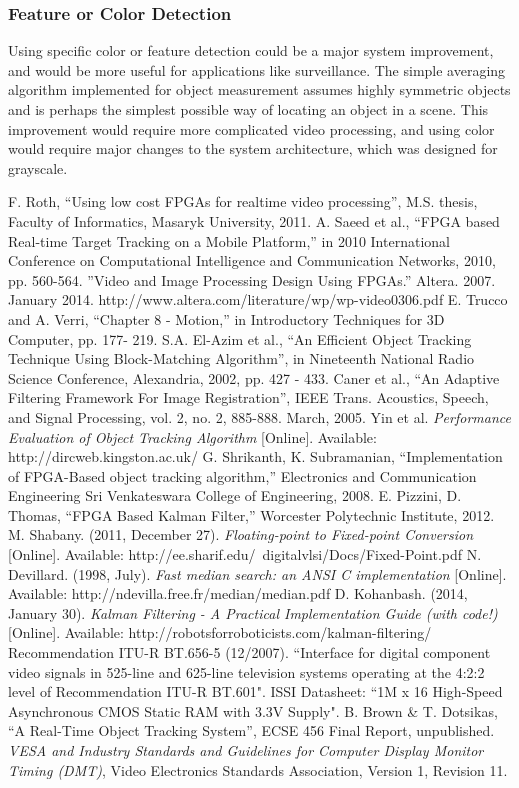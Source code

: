 \documentclass[11pt]{article} %
\begin{document}
\subsubsection{Feature or Color Detection}
Using specific color or feature detection could be a major system improvement, and would be more useful for applications like surveillance. The simple averaging algorithm implemented for object measurement assumes highly symmetric objects and is perhaps the simplest possible way of locating an object in a scene. This improvement would require more complicated video processing, and using color would require major changes to the system architecture, which was designed for grayscale.
\newpage
\begin{thebibliography}{11}
F. Roth, “Using low cost FPGAs for realtime video processing”, M.S. thesis, Faculty of Informatics, Masaryk University, 2011.
A. Saeed et al., “FPGA based Real-time Target Tracking on a Mobile Platform,” in 2010 International Conference on Computational Intelligence and Communication Networks, 2010, pp. 560-564.
”Video and Image Processing Design Using FPGAs.” Altera. 2007. January 2014. 
http://www.altera.com/literature/wp/wp-video0306.pdf  
E. Trucco and A. Verri, “Chapter 8 - Motion,” in Introductory Techniques for 3D Computer, pp. 177- 219.
S.A. El-Azim et al., “An Efficient Object Tracking Technique Using Block-Matching Algorithm”, in Nineteenth National Radio Science Conference, Alexandria, 2002, pp. 427 - 433.
Caner et al., “An Adaptive Filtering Framework For Image Registration”, IEEE Trans. Acoustics, Speech, and Signal Processing, vol. 2, no. 2, 885-888. March, 2005. 
Yin et al. \textit{Performance Evaluation of Object Tracking Algorithm} [Online]. Available: http://dircweb.kingston.ac.uk/ 
G. Shrikanth, K. Subramanian, “Implementation of FPGA-Based object tracking algorithm,” Electronics and Communication Engineering Sri Venkateswara College of Engineering, 2008.
E. Pizzini, D. Thomas, “FPGA Based Kalman Filter,” Worcester Polytechnic Institute, 2012.
M. Shabany. (2011, December 27). \textit{Floating-point to Fixed-point Conversion} [Online]. Available: http://ee.sharif.edu/~digitalvlsi/Docs/Fixed-Point.pdf
N. Devillard. (1998, July). \textit{Fast median search: an ANSI C implementation} [Online]. Available: http://ndevilla.free.fr/median/median.pdf
D. Kohanbash. (2014, January 30). \textit{Kalman Filtering - A Practical Implementation Guide (with code!)} [Online]. Available: http://robotsforroboticists.com/kalman-filtering/
 Recommendation ITU-R BT.656-5 (12/2007). “Interface for digital component video signals in 525-line and 625-line television systems operating at the 4:2:2 level of Recommendation ITU-R BT.601". 
 ISSI Datasheet: “1M x 16 High-Speed Asynchronous CMOS Static RAM with 3.3V Supply".
 B. Brown \& T. Dotsikas, “A Real-Time Object Tracking System”, ECSE 456 Final Report, unpublished.
 \textit{VESA and Industry Standards and Guidelines for Computer Display Monitor Timing (DMT)}, Video Electronics Standards Association, Version 1, Revision 11.
\end{thebibliography}
\newpage
\appendix
\appendixpage
\end{document}
